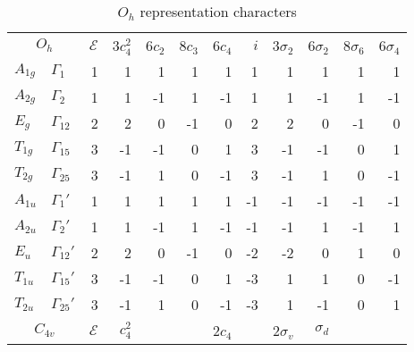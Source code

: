 \documentclass[twocolumn,showpacs,preprintnumbers,superscriptaddress,prb,floatfix,aps,10pt]{revtex4-1}
\newcommand*{\id}{\mathcal{E}}
\begin{document}
\begin{table}
\caption{\label{table:chi} $O_h$ representation characters}
\begin{ruledtabular}
\begin{tabular*}{10cm}{llrrrrrrrrrr}
\multicolumn{2}{c}{$O_h$}         &$\id$&3$c_4^2$& 6$c_2$ & 8$c_3$ & 6$c_4$ &  $i$ & 3$\sigma_2$ & 6$\sigma_2$ & 8$\sigma_6$ & 6$\sigma_4$ \\  
$A_{1g}$        & $\Gamma_{1}  $  &  1  &     1  &     1  &     1  &     1  &   1  &          1  &          1  &          1  &          1  \\         %
$A_{2g}$        & $\Gamma_{2}  $  &  1  &     1  &    -1  &     1  &    -1  &   1  &          1  &         -1  &          1  &         -1  \\         %
$E_g   $        & $\Gamma_{12} $  &  2  &     2  &     0  &    -1  &     0  &   2  &          2  &          0  &         -1  &          0  \\         %
$T_{1g}$        & $\Gamma_{15} $  &  3  &    -1  &    -1  &     0  &     1  &   3  &         -1  &         -1  &          0  &          1  \\         %
$T_{2g}$        & $\Gamma_{25} $  &  3  &    -1  &     1  &     0  &    -1  &   3  &         -1  &          1  &          0  &         -1  \\         %
$A_{1u}$        & $\Gamma_{1} '$  &  1  &     1  &     1  &     1  &     1  &  -1  &         -1  &         -1  &         -1  &         -1  \\         %
$A_{2u}$        & $\Gamma_{2} '$  &  1  &     1  &    -1  &     1  &    -1  &  -1  &         -1  &          1  &         -1  &          1  \\         %
$E_u   $        & $\Gamma_{12}'$  &  2  &     2  &     0  &    -1  &     0  &  -2  &         -2  &          0  &          1  &          0  \\         %
$T_{1u}$        & $\Gamma_{15}'$  &  3  &    -1  &    -1  &     0  &     1  &  -3  &          1  &          1  &          0  &         -1  \\         %
$T_{2u}$        & $\Gamma_{25}'$  &  3  &    -1  &     1  &     0  &    -1  &  -3  &          1  &         -1  &          0  &          1  \\ \hline  %
\multicolumn{2}{c}{$C_{4v}$}      &$\id$& $c_4^2$&        &        & 2$c_4$ &      & 2$\sigma_v$ &  $\sigma_d$ &             &             \\ 

\end{tabular*}
\end{ruledtabular}
\end{table}
\end{document}
